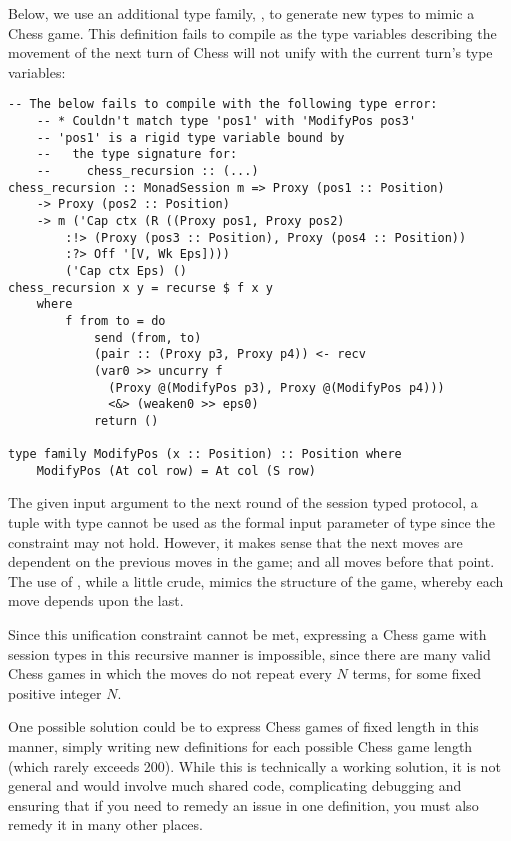 Below, we use an additional type family, , to generate new  types to mimic a Chess game. This definition fails to compile as the type variables describing the movement of the next turn of Chess will not unify with the current turn's type variables:

\begin{lstlisting}
-- The below fails to compile with the following type error:
    -- * Couldn't match type 'pos1' with 'ModifyPos pos3'
    -- 'pos1' is a rigid type variable bound by
    --   the type signature for:
    --     chess_recursion :: (...)
chess_recursion :: MonadSession m => Proxy (pos1 :: Position)
    -> Proxy (pos2 :: Position)
    -> m ('Cap ctx (R ((Proxy pos1, Proxy pos2)
        :!> (Proxy (pos3 :: Position), Proxy (pos4 :: Position))
        :?> Off '[V, Wk Eps])))
        ('Cap ctx Eps) ()
chess_recursion x y = recurse $ f x y
    where
        f from to = do
            send (from, to)
            (pair :: (Proxy p3, Proxy p4)) <- recv
            (var0 >> uncurry f
              (Proxy @(ModifyPos p3), Proxy @(ModifyPos p4)))
              <&> (weaken0 >> eps0)
            return ()

type family ModifyPos (x :: Position) :: Position where
    ModifyPos (At col row) = At col (S row)
\end{lstlisting}

The given input argument to the next round of the session typed protocol, a tuple with type  cannot be used as the formal input parameter of type  since the constraint  may not hold. However, it makes sense that the next moves are dependent on the previous moves in the game; and all moves before that point. The use of , while a little crude, mimics the structure of the game, whereby each move depends upon the last.

Since this unification constraint cannot be met, expressing a Chess game with session types in this recursive manner is impossible, since there are many valid Chess games in which the moves do not repeat every $N$ terms, for some fixed positive integer $N$.

One possible solution could be to express Chess games of fixed length in this manner, simply writing new definitions for each possible Chess game length (which rarely exceeds 200). While this is technically a working solution, it is not general and would involve much shared code, complicating debugging and ensuring that if you need to remedy an issue in one definition, you must also remedy it in many other places.

